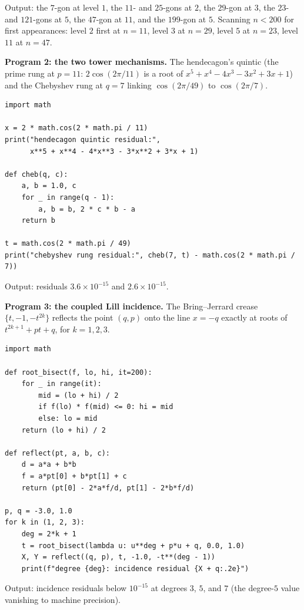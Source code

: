 \documentclass[11pt]{amsart}
\theoremstyle{plain}
\theoremstyle{definition}
\begin{document}
Output: the $7$-gon at level $1$, the $11$- and $25$-gons at $2$, the $29$-gon at $3$, the $23$- and $121$-gons at $5$, the $47$-gon at $11$, and the $199$-gon at $5$. Scanning $n < 200$ for first appearances: level $2$ first at $n=11$, level $3$ at $n=29$, level $5$ at $n=23$, level $11$ at $n=47$.

\medskip
\noindent\textbf{Program 2: the two tower mechanisms.} The hendecagon's quintic (the prime rung at $p=11$: $2\cos(2\pi/11)$ is a root of $x^5 + x^4 - 4x^3 - 3x^2 + 3x + 1$) and the Chebyshev rung at $q=7$ linking $\cos(2\pi/49)$ to $\cos(2\pi/7)$.

\begin{lstlisting}
import math

x = 2 * math.cos(2 * math.pi / 11)
print("hendecagon quintic residual:",
      x**5 + x**4 - 4*x**3 - 3*x**2 + 3*x + 1)

def cheb(q, c):
    a, b = 1.0, c
    for _ in range(q - 1):
        a, b = b, 2 * c * b - a
    return b

t = math.cos(2 * math.pi / 49)
print("chebyshev rung residual:", cheb(7, t) - math.cos(2 * math.pi / 7))
\end{lstlisting}

Output: residuals $3.6\times 10^{-15}$ and $2.6\times 10^{-15}$.

\medskip
\noindent\textbf{Program 3: the coupled Lill incidence.} The Bring--Jerrard crease $\{t,-1,-t^{2k}\}$ reflects the point $(q,p)$ onto the line $x=-q$ exactly at roots of $t^{2k+1} + pt + q$, for $k=1,2,3$.

\begin{lstlisting}
import math

def root_bisect(f, lo, hi, it=200):
    for _ in range(it):
        mid = (lo + hi) / 2
        if f(lo) * f(mid) <= 0: hi = mid
        else: lo = mid
    return (lo + hi) / 2

def reflect(pt, a, b, c):
    d = a*a + b*b
    f = a*pt[0] + b*pt[1] + c
    return (pt[0] - 2*a*f/d, pt[1] - 2*b*f/d)

p, q = -3.0, 1.0
for k in (1, 2, 3):
    deg = 2*k + 1
    t = root_bisect(lambda u: u**deg + p*u + q, 0.0, 1.0)
    X, Y = reflect((q, p), t, -1.0, -t**(deg - 1))
    print(f"degree {deg}: incidence residual {X + q:.2e}")
\end{lstlisting}

Output: incidence residuals below $10^{-15}$ at degrees $3$, $5$, and $7$ (the degree-$5$ value vanishing to machine precision).
\end{document}

